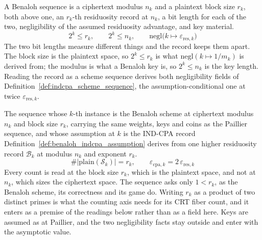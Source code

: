 \begin{definition}
  \label{def:benaloh_scheme_sequence}
  \rocqok
  A Benaloh sequence is a ciphertext modulus $n_k$ and a plaintext block size
  $r_k$, both above one, an $r_k$-th residuosity record at $n_k$, a bit length
  for each of the two, negligibility of the assumed residuosity advantage, and
  key material.
  \[ 2^k \le r_k, \qquad 2^k \le n_k, \qquad
     \mathrm{negl}\big(k \mapsto \varepsilon_{\mathrm{res},k}\big) \]
  The two bit lengths measure different things and the record keeps them apart.
  The block size is the plaintext space, so $2^k \le r_k$ is what
  $\mathrm{negl}(k \mapsto 1/m_k)$ is derived from; the modulus is what a
  Benaloh key is, so $2^k \le n_k$ is the key length. Reading the record as a
  scheme sequence derives both negligibility fields of
  Definition~\ref{def:indcpa_scheme_sequence}, the assumption-conditional one
  at twice $\varepsilon_{\mathrm{res},k}$.
\end{definition}

\begin{definition}
  \label{def:benaloh_setting}
  \rocqok
  The sequence whose $k$-th instance is the Benaloh scheme at ciphertext
  modulus $n_k$ and block size $r_k$, carrying the same weights, keys and
  coins as the Paillier sequence, and whose assumption at $k$ is the IND-CPA
  record Definition~\ref{def:benaloh_indcpa_assumption} derives from one
  higher residuosity record $\mathcal{B}_k$ at modulus $n_k$ and exponent
  $r_k$.
  \[ \#\lvert\mathrm{plain}(\mathcal{S}_k)\rvert = r_k, \qquad
     \varepsilon_{\mathrm{cpa},k} = 2\,\varepsilon_{\mathrm{res},k} \]
  Every count is read at the block size $r_k$, which is the plaintext space,
  and not at $n_k$, which sizes the ciphertext space. The sequence asks only
  $1 < r_k$, as the Benaloh scheme, its correctness and its game do. Writing
  $r_k$ as a product of two distinct primes is what the counting axis needs
  for its CRT fiber count, and it enters as a premise of the readings below
  rather than as a field here. Keys are assumed as at Paillier, and the two
  negligibility facts stay outside and enter with the asymptotic value.
\end{definition}

